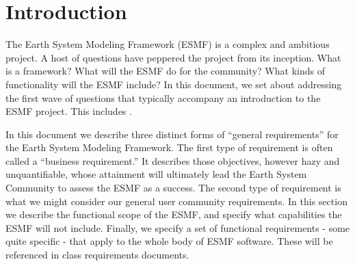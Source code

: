 \section{Introduction}

The Earth System Modeling Framework (ESMF) is a complex and ambitious 
project.  A host of questions have peppered the project from its inception.
What is a framework?  What will the ESMF do for the community?  What 
kinds of functionality will the ESMF include?  In this document, we 
set about addressing the first wave of questions that typically accompany
an introduction to the ESMF project.  This includes .  

In this document we describe three distinct forms of ``general requirements'' 
for the Earth System Modeling Framework.  The first type of requirement
is often called a ``business requirement.''  It describes those objectives,
however hazy and unquantifiable, whose attainment will ultimately lead the 
Earth System Community to assess the ESMF as a success.  The second type
of requirement is what we might consider our general user community 
requirements.  In this section we describe the functional scope of the 
ESMF, and specify what capabilities the ESMF will not include.  Finally, 
we specify a set of functional requirements - some quite specific - that 
apply to the whole body of ESMF software.  These will be referenced in 
class requirements documents.




